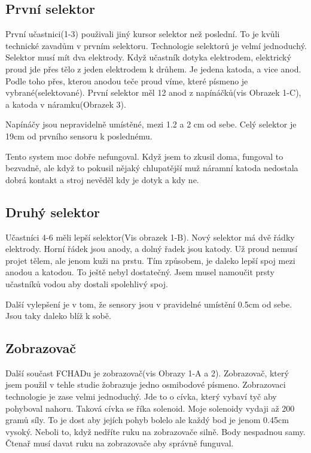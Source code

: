 \subsection{První selektor}

První učastnici(1-3) použivali jiný kursor selektor než poslední.  To je kvůli technické zavadům v prvním selektoru.   Technologie selektorů je velmí jednoduchý.  Selektor musí mít dva elektrody.  Když učastník dotyka elektrodem, elektrický proud jde přes tělo z jeden elektrodem k drůhem.  Je jedena katoda, a vice anod.  Podle toho přes, kterou anodou teče proud víme, které písmeno je vybrané(selektované).   První selektor měl 12 anod z napínáčků(vis Obrazek 1-C), a katoda v náramku(Obrazek 3).

Napínáčy jsou nepravidelně umístěné, mezi 1.2 a 2 cm od sebe.  Celý selektor je 19cm od prvního sensoru k poslednému.

Tento system moc dobře nefungoval. Když jsem to zkusil doma, fungoval to bezvadně, ale když to pokusil nějaký chlupatější muž náramní katoda nedostala dobrá kontakt a stroj nevěděl kdy je dotyk a kdy ne.

\subsection{Druhý selektor}

Učastníci 4-6 měli lepší selektor(Vis obrazek 1-B). Nový selektor má dvě řádky elektrody. Horní řádek jsou anody, a dolný řadek jsou katody.  Už proud nemusí projet tělem, ale jenom kuži na prstu.  Tím způsobem, je daleko lepší spoj mezi anodou a katodou.  To ještě nebyl dostatečný.  Jsem musel namoučit prsty učastníků vodou aby dostali spolehlivý spoj.

Další vylepšení je v tom, že sensory jsou v pravidelné umístění 0.5cm od sebe.  Jsou taky daleko blíž k sobě.

\subsection{Zobrazovač}
Další součast FCHADu je zobrazovač(vis Obrazy 1-A a 2).  Zobrazovač, který jsem použil v tehle studie žobrazuje jedno osmibodové písmeno.  Zobrazovaci technologie je zase velmi jednoduchý.  Jde to o cívka, který vybaví tyč aby pohyboval nahoru.  Taková cívka se říka solenoid.  Moje solenoidy vydaji až 200 gramů síly\citep{multicomp}.  To je dost aby jejích pohyb bolelo ale každý bod je jenom 0.45cm vysoký.  Neboli to, když nedříte ruku na zobrazovače silně.  Body nespadnou samy.  Čtenař musí davat ruku na zobrazovače aby správně funguval.

